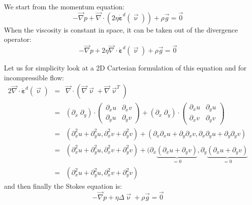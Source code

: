 We start from the momentum equation:
\begin{equation}
-{\vec \nabla}p + {\vec \nabla}\cdot (2 \eta \dot{\bm \varepsilon}^d(\vec\upnu) ) + \rho {\vec g} = \vec{0}
\end{equation}
When the viscosity is constant in space, it can be taken out of the divergence operator:
\begin{equation}
-{\vec \nabla}p + 2 \eta {\vec \nabla}\cdot \dot{\bm \varepsilon}^d(\vec\upnu)  + \rho {\vec g} = \vec{0}
\end{equation}

Let us for simplicity look at a 2D Cartesian formulation of this equation and for incompressible flow:
\begin{eqnarray}
2 {\vec \nabla}\cdot \dot{\bm \varepsilon}^d (\vec\upnu)
&=& \vec\nabla \cdot \left( \vec\nabla \vec\upnu + \vec\nabla \vec\upnu ^T \right) \\ 
&=& 
(\partial_x \; \partial_y) \cdot
\left(
\begin{array}{cc}
\partial_x u & \partial_x v \\
\partial_y u & \partial_y v 
\end{array}
\right) + 
(\partial_x \; \partial_y) \cdot
\left(
\begin{array}{cc}
\partial_x u & \partial_y u \\
\partial_x v & \partial_y v 
\end{array}
\right) \\
&=&( \partial_x^2 u + \partial_y^2 u , \partial_x^2 v + \partial_y^2 v )
+(\partial_x \partial_x u + \partial_y \partial_x v , 
 \partial_x \partial_y u + \partial_y \partial_y v)  \\
&=&( \partial_x^2 u + \partial_y^2 u , \partial_x^2 v + \partial_y^2 v )
+(\partial_x \underbrace{(\partial_x u + \partial_y v)}_{=0} , 
  \partial_y \underbrace{(\partial_x u + \partial_y v)}_{=0}  \\
&=&( \partial_x^2 u + \partial_y^2 u , \partial_x^2 v + \partial_y^2 v )
\end{eqnarray}
and then finally the Stokes equation is:
\begin{equation}
-\vec\nabla p  + \eta \Delta \vec \upnu + \rho \vec g = \vec{0}
\end{equation}

